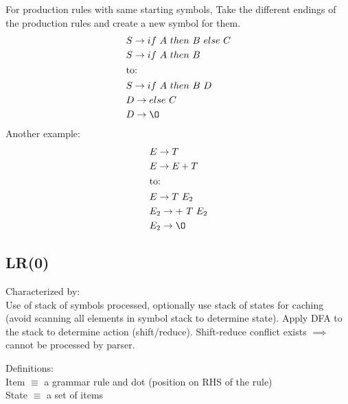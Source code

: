 \documentclass[8pt]{extarticle}
\begin{document}
\begin{multicols*}{2}
  For production rules with same starting symbols, Take the different endings of the production rules and create a new symbol for them.
  \begin{align*}
    &\begin{aligned}
    &S \rightarrow if\ A\ then\ B\ else\ C\\
    &S \rightarrow if\ A\ then\ B
     \end{aligned}\\
    &\text{to:}\\
    &\begin{aligned}
    &S \rightarrow if\ A\ then\ B\ D\\
    &D \rightarrow else\ C\\
    &D \rightarrow \O
     \end{aligned}
  \end{align*}
  Another example:
  \begin{align*}
  &\begin{aligned}
    &E \rightarrow T\\
    &E \rightarrow E + T
  \end{aligned}\\
    &\text{to:}\\
  &\begin{aligned}
    &E \rightarrow T\ E_2\\
    &E_2 \rightarrow +\ T\ E_2\\
    &E_2 \rightarrow \O\\
   \end{aligned}
  \end{align*}
  
  \vfill\null
  \columnbreak
    
  \subsection{LR(0)}
  Characterized by:\\
  Use of stack of symbols processed, optionally use stack of states for caching (avoid scanning all elements in symbol stack to determine state). Apply DFA to the stack to determine action (shift/reduce). Shift-reduce conflict exists $\implies$ cannot be processed by parser.

  Definitions:\\
  Item $\equiv$ a grammar rule and dot (position on RHS of the rule)\\
  State $\equiv$ a set of items


\end{multicols*}
\end{document}
